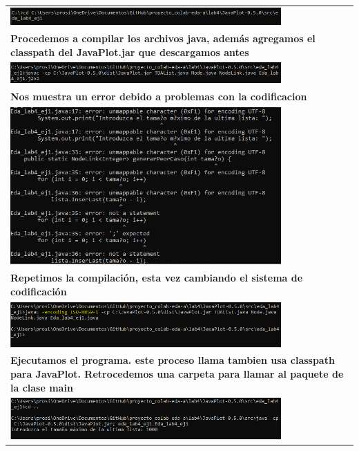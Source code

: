 \documentclass[9pt]{article}
\begin{document}
\begin{longtable}{|p{15cm}|}
		\includegraphics[width=0.8\textwidth,keepaspectratio]{img/redireccion1.png}\\
		\textbf{Procedemos a compilar los archivos java, además agregamos el classpath del JavaPlot.jar que descargamos antes}\\
		\includegraphics[width=0.8\textwidth,keepaspectratio]{img/compilar1.png}\\
		
		\textbf{Nos muestra un error debido a problemas con la codificacion}\\
		\includegraphics[width=0.8\textwidth,keepaspectratio]{img/errorcompile1.png}\\
		
		\textbf{Repetimos la compilación, esta vez cambiando el sistema de codificación}\\
		\includegraphics[width=0.8\textwidth,keepaspectratio]{img/cambioEncoding.png}\\
		
		\textbf{Ejecutamos el programa. este proceso llama tambien usa classpath para JavaPlot. Retrocedemos una carpeta para llamar al paquete de la clase main }\\
		\includegraphics[width=0.8\textwidth,keepaspectratio]{img/ejecucion1.png}\\
		

\end{longtable}
\end{document}
